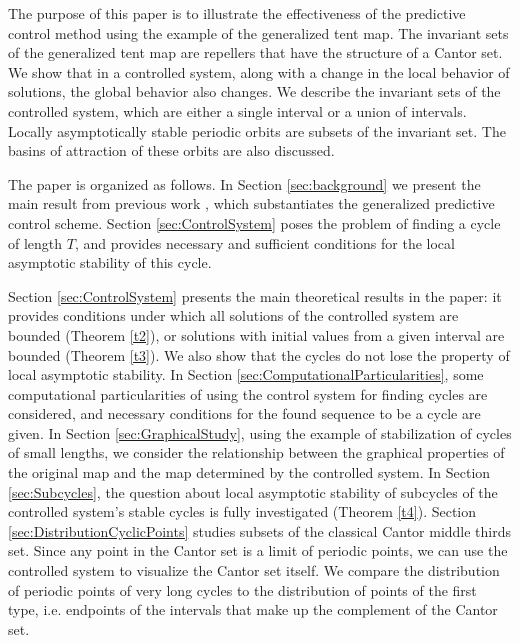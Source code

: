 \documentclass[12pt,a4paper]{amsart}
\begin{document}
The purpose of this paper is to illustrate the effectiveness of the predictive control method using the example of the generalized tent map. 
The invariant sets of the generalized tent map are repellers that have the structure of a Cantor set. We show that in a controlled system, 
along with a change in the local behavior of solutions, the global behavior also changes. We describe the invariant sets of the controlled system, 
which are either a single interval or a union of intervals. Locally asymptotically stable periodic orbits are subsets of the invariant set. The basins of 
attraction of these orbits are also discussed. 

The paper is organized as follows. In Section \ref{sec:background} we present the main result from previous work \cite{DSI}, which substantiates the generalized 
predictive control scheme. Section \ref{sec:ControlSystem} poses the problem of finding a cycle of length $T$, and provides necessary and sufficient conditions
for the local asymptotic stability of this cycle. 

Section \ref{sec:ControlSystem} presents the main theoretical results in the paper:  it provides conditions under which all solutions 
of the controlled system are bounded (Theorem \ref{t2}), or solutions with initial values from a given interval are bounded (Theorem \ref{t3}). We also show that the cycles do not lose the property of local asymptotic stability. In Section \ref{sec:ComputationalParticularities}, some computational particularities of using 
the control system for finding cycles are considered, and  necessary conditions for the found sequence to be a cycle are given. 
In Section \ref{sec:GraphicalStudy}, using the example of stabilization of cycles of small lengths, we consider the relationship between the graphical properties of the original 
map and the map determined by the controlled system. In Section \ref{sec:Subcycles}, the question about local asymptotic stability of subcycles of the controlled 
system's stable cycles is fully investigated (Theorem \ref{t4}). Section \ref{sec:DistributionCyclicPoints} studies subsets of the classical Cantor middle thirds set. Since any point in the Cantor set is a limit of periodic points, we can use the controlled system to visualize the Cantor set itself.
We compare the distribution of periodic points of very long cycles to the distribution of points of the first type, i.e. endpoints of the intervals that make up the complement of the Cantor set.
\end{document}
